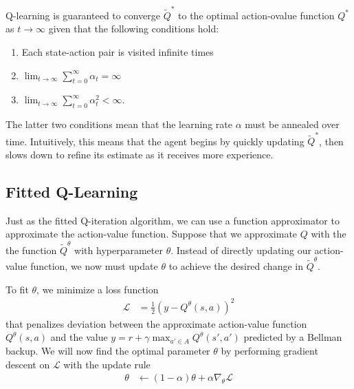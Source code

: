 \documentclass[11pt]{article}
\numberwithin{equation}{section}
\numberwithin{figure}{section}
\begin{document}
Q-learning is guaranteed to converge $\tilde{Q}^*$ to the optimal action-ovalue
function $Q^*$ as $t \to \infty$ given that the following conditions hold:
\begin{enumerate}
    \item Each state-action pair is visited infinite times
    \item $\lim_{t \to \infty} \sum_{t = 0}^\infty \alpha_t = \infty$
    \item $\lim_{t \to \infty} \sum_{t = 0}^\infty \alpha_t^2 < \infty$.
\end{enumerate}
The latter two conditions mean that the learning rate $\alpha$ must be annealed
over time. Intuitively, this means that the agent begins by quickly updating
$\tilde{Q}^*$, then slows down to refine its estimate as it receives more
experience.

\subsection{Fitted Q-Learning}
Just as the fitted Q-iteration algorithm, we can use a function approximator to
approximate the action-value function. Suppose that we approximate $Q$ with the
the function $\tilde{Q}^\theta$ with hyperparameter $\theta$. Instead of
directly updating our action-value function, we now must update $\theta$ to
achieve the desired change in $\tilde{Q}^\theta$.

To fit $\theta$, we minimize a loss function
\begin{align*}
    \mathcal{L} &= \frac{1}{2} \left( y - Q^\theta(s, a) \right)^2
\end{align*}
that penalizes deviation between the approximate action-value function
$Q^\theta(s, a)$ and the value $y = r + \gamma \max_{a' \in A} Q^\theta(s',
a')$ predicted by a Bellman backup. We will now find the optimal parameter
$\theta$ by performing gradient descent on $\mathcal{L}$ with the update rule
\begin{align}
    \theta &\gets (1 - \alpha) \theta + \alpha \nabla_\theta \mathcal{L}
    \label{eqn:qlearning-step}
\end{align}
\end{document}
